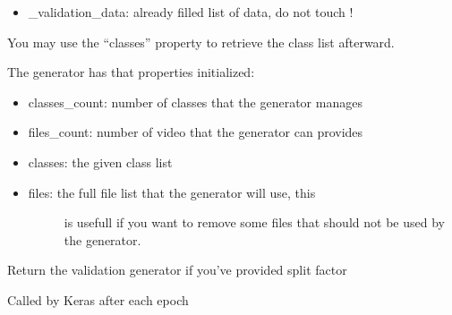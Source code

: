 \documentclass[letterpaper,10pt,english]{sphinxmanual}
\begin{document}
\begin{fulllineitems}
\begin{itemize}
\begin{description}
\end{description}

\item {} 
\_validation\_data: already filled list of data, do not touch !

\end{itemize}

You may use the “classes” property to retrieve the class list afterward.

The generator has that properties initialized:
\begin{itemize}
\item {} 
classes\_count: number of classes that the generator manages

\item {} 
files\_count: number of video that the generator can provides

\item {} 
classes: the given class list

\item {} \begin{description}
\item[{files: the full file list that the generator will use, this}] \leavevmode
is usefull if you want to remove some files that should not be
used by the generator.

\end{description}

\end{itemize}

\begin{fulllineitems}
\label{\detokenize{index:keras_video.generator.VideoFrameGenerator.get_validation_generator}}
Return the validation generator if you’ve provided split factor

\end{fulllineitems}


\begin{fulllineitems}
\label{\detokenize{index:keras_video.generator.VideoFrameGenerator.on_epoch_end}}
Called by Keras after each epoch

\end{fulllineitems}


\end{fulllineitems}
\end{document}
